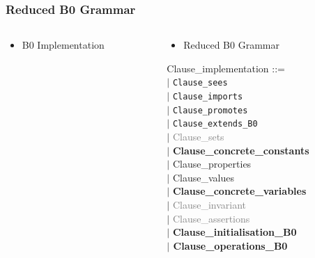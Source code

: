 \documentclass[12pt]{beamer}
\begin{document}
\begin{frame}[fragile]
\frametitle{Reduced B0 Grammar}

\begin{columns}[t]

\begin{column}[T]{5cm}
	\begin{itemize}
	\item B0 Implementation	
	\end{itemize}	     
\footnotesize{
}

  \end{column}

\begin{column}[T]{5cm} 
	\begin{itemize}
	\item Reduced B0 Grammar	
	\end{itemize}	     
\scriptsize{
\begin{sloppypar} 
Clause\_implementation ::=\\
\hspace*{0.20in} $|$ \texttt{Clause\_sees}\\
\hspace*{0.20in} $|$ \texttt{Clause\_imports}\\
\hspace*{0.20in} $|$ \texttt{Clause\_promotes}\\
\hspace*{0.20in} $|$ \texttt{Clause\_extends\_B0} \\
\hspace*{0.20in} $|$ \textcolor{gray}{Clause\_sets}\\
\hspace*{0.20in} $|$ \textbf{Clause\_concrete\_constants}\\
\hspace*{0.20in} $|$ Clause\_properties\\
\hspace*{0.20in} $|$ Clause\_values\\
\hspace*{0.20in} $|$ \textbf{Clause\_concrete\_variables}\\
\hspace*{0.20in} $|$ \textcolor{gray}{Clause\_invariant}\\
\hspace*{0.20in} $|$ \textcolor{gray}{Clause\_assertions}\\
\hspace*{0.20in} $|$ \textbf{Clause\_initialisation\_B0\\
\hspace*{0.20in} $|$ Clause\_operations\_B0}\\
\end{sloppypar}}


\end{column}
\end{columns}
\end{frame}
\end{document}
